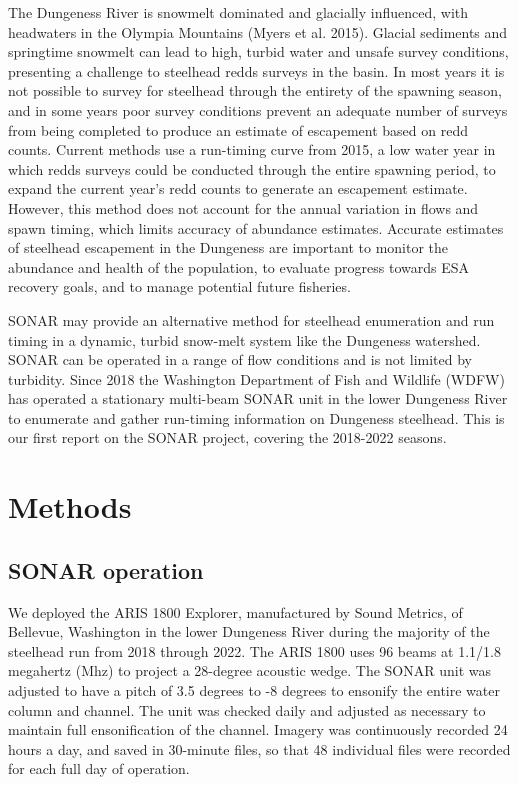 \documentclass[
]{article}
\begin{document}
The Dungeness River is snowmelt dominated and glacially influenced, with headwaters in the Olympia Mountains (Myers et al. 2015). Glacial sediments and springtime snowmelt can lead to high, turbid water and unsafe survey conditions, presenting a challenge to steelhead redds surveys in the basin. In most years it is not possible to survey for steelhead through the entirety of the spawning season, and in some years poor survey conditions prevent an adequate number of surveys from being completed to produce an estimate of escapement based on redd counts. Current methods use a run-timing curve from 2015, a low water year in which redds surveys could be conducted through the entire spawning period, to expand the current year's redd counts to generate an escapement estimate. However, this method does not account for the annual variation in flows and spawn timing, which limits accuracy of abundance estimates. Accurate estimates of steelhead escapement in the Dungeness are important to monitor the abundance and health of the population, to evaluate progress towards ESA recovery goals, and to manage potential future fisheries.

SONAR may provide an alternative method for steelhead enumeration and run timing in a dynamic, turbid snow-melt system like the Dungeness watershed. SONAR can be operated in a range of flow conditions and is not limited by turbidity. Since 2018 the Washington Department of Fish and Wildlife (WDFW) has operated a stationary multi-beam SONAR unit in the lower Dungeness River to enumerate and gather run-timing information on Dungeness steelhead. This is our first report on the SONAR project, covering the 2018-2022 seasons.

\hypertarget{methods}{%
\section{Methods}\label{methods}}

\hypertarget{sonar-operation}{%
\subsection{SONAR operation}\label{sonar-operation}}

We deployed the ARIS 1800 Explorer, manufactured by Sound Metrics, of Bellevue, Washington in the lower Dungeness River during the majority of the steelhead run from 2018 through 2022. The ARIS 1800 uses 96 beams at 1.1/1.8 megahertz (Mhz) to project a 28-degree acoustic wedge. The SONAR unit was adjusted to have a pitch of 3.5 degrees to -8 degrees to ensonify the entire water column and channel. The unit was checked daily and adjusted as necessary to maintain full ensonification of the channel. Imagery was continuously recorded 24 hours a day, and saved in 30-minute files, so that 48 individual files were recorded for each full day of operation.
\end{document}
